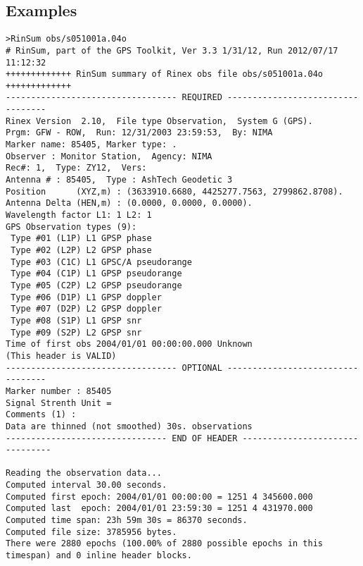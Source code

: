 \subsection{Examples}
\begin{\outputsize}
\begin{lstlisting}
>RinSum obs/s051001a.04o
# RinSum, part of the GPS Toolkit, Ver 3.3 1/31/12, Run 2012/07/17 11:12:32
+++++++++++++ RinSum summary of Rinex obs file obs/s051001a.04o +++++++++++++
---------------------------------- REQUIRED ----------------------------------
Rinex Version  2.10,  File type Observation,  System G (GPS).
Prgm: GFW - ROW,  Run: 12/31/2003 23:59:53,  By: NIMA
Marker name: 85405, Marker type: .
Observer : Monitor Station,  Agency: NIMA
Rec#: 1,  Type: ZY12,  Vers: 
Antenna # : 85405,  Type : AshTech Geodetic 3
Position      (XYZ,m) : (3633910.6680, 4425277.7563, 2799862.8708).
Antenna Delta (HEN,m) : (0.0000, 0.0000, 0.0000).
Wavelength factor L1: 1 L2: 1
GPS Observation types (9):
 Type #01 (L1P) L1 GPSP phase
 Type #02 (L2P) L2 GPSP phase
 Type #03 (C1C) L1 GPSC/A pseudorange
 Type #04 (C1P) L1 GPSP pseudorange
 Type #05 (C2P) L2 GPSP pseudorange
 Type #06 (D1P) L1 GPSP doppler
 Type #07 (D2P) L2 GPSP doppler
 Type #08 (S1P) L1 GPSP snr
 Type #09 (S2P) L2 GPSP snr
Time of first obs 2004/01/01 00:00:00.000 Unknown
(This header is VALID)
---------------------------------- OPTIONAL ----------------------------------
Marker number : 85405
Signal Strenth Unit = 
Comments (1) :
Data are thinned (not smoothed) 30s. observations
-------------------------------- END OF HEADER --------------------------------

Reading the observation data...
Computed interval 30.00 seconds.
Computed first epoch: 2004/01/01 00:00:00 = 1251 4 345600.000
Computed last  epoch: 2004/01/01 23:59:30 = 1251 4 431970.000
Computed time span: 23h 59m 30s = 86370 seconds.
Computed file size: 3785956 bytes.
There were 2880 epochs (100.00% of 2880 possible epochs in this timespan) and 0 inline header blocks.


\end{lstlisting}
\end{\outputsize}
